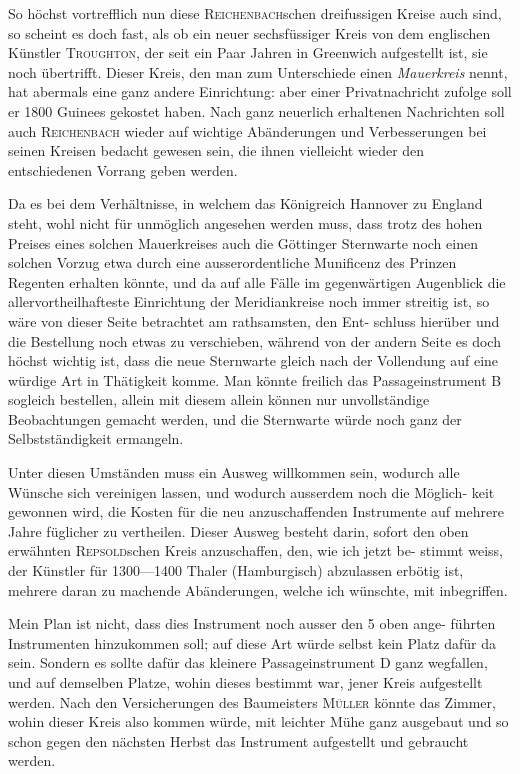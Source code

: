 \documentclass[12pt,a4paper]{article}
\theoremstyle{plain}
\theoremstyle{definition}
\theoremstyle{remark}
\begin{document}
So h\"{o}chst vortrefflich nun diese \textsc{Reichenbach}schen dreifussigen Kreise
auch sind, so scheint es doch fast, als ob ein neuer sechsf\"{u}ssiger Kreis von
dem englischen K\"{u}nstler \textsc{Troughton}, der seit ein Paar Jahren in Greenwich
aufgestellt ist, sie noch \"{u}bertrifft. Dieser Kreis, den man zum Unterschiede
einen \textit{Mauerkreis} nennt, hat abermals eine ganz andere Einrichtung: aber
einer Privatnachricht zufolge soll er 1800 Guinees gekostet haben. Nach ganz
neuerlich erhaltenen Nachrichten soll auch \textsc{Reichenbach} wieder auf wichtige
Ab\"{a}nderungen und Verbesserungen bei seinen Kreisen bedacht gewesen sein,
die ihnen vielleicht wieder den entschiedenen Vorrang geben werden.

Da es bei dem Verh\"{a}ltnisse, in welchem das K\"{o}nigreich Hannover zu
England steht, wohl nicht f\"{u}r unm\"{o}glich angesehen werden muss, dass trotz
des hohen Preises eines solchen Mauerkreises auch die G\"{o}ttinger Sternwarte
noch einen solchen Vorzug etwa durch eine ausserordentliche Munificenz des
Prinzen Regenten erhalten k\"{o}nnte, und da auf alle F\"{a}lle im gegenw\"{a}rtigen
Augenblick die allervortheilhafteste Einrichtung der Meridiankreise noch immer
streitig ist, so w\"{a}re von dieser Seite betrachtet am rathsamsten, den Ent-
schluss hier\"{u}ber und die Bestellung noch etwas zu verschieben, w\"{a}hrend von
der andern Seite es doch h\"{o}chst wichtig ist, dass die neue Sternwarte gleich
nach der Vollendung auf eine w\"{u}rdige Art in Th\"{a}tigkeit komme. Man k\"{o}nnte
freilich das Passageinstrument B sogleich bestellen, allein mit diesem allein
k\"{o}nnen nur unvollst\"{a}ndige Beobachtungen gemacht werden, und die Sternwarte
w\"{u}rde noch ganz der Selbstst\"{a}ndigkeit ermangeln.

Unter diesen Umst\"{a}nden muss ein Ausweg willkommen sein, wodurch
alle W\"{u}nsche sich vereinigen lassen, und wodurch ausserdem noch die M\"{o}glich-
keit gewonnen wird, die Kosten f\"{u}r die neu anzuschaffenden Instrumente auf
mehrere Jahre f\"{u}glicher zu vertheilen. Dieser Ausweg besteht darin, sofort
den oben erw\"{a}hnten \textsc{Repsold}schen Kreis anzuschaffen, den, wie ich jetzt be-
stimmt weiss, der K\"{u}nstler f\"{u}r 1300---1400 Thaler (Hamburgisch) abzulassen
erb\"{o}tig ist, mehrere daran zu machende Ab\"{a}nderungen, welche ich w\"{u}nschte,
mit inbegriffen.

Mein Plan ist nicht, dass dies Instrument noch ausser den 5 oben ange-
f\"{u}hrten Instrumenten hinzukommen soll; auf diese Art w\"{u}rde selbst kein
Platz daf\"{u}r da sein. Sondern es sollte daf\"{u}r das kleinere Passageinstrument
D ganz wegfallen, und auf demselben Platze, wohin dieses bestimmt war, jener
Kreis aufgestellt werden. Nach den Versicherungen des Baumeisters \textsc{M\"{u}ller}
k\"{o}nnte das Zimmer, wohin dieser Kreis also kommen w\"{u}rde, mit leichter
M\"{u}he ganz ausgebaut und so schon gegen den n\"{a}chsten Herbst das Instrument
aufgestellt und gebraucht werden.
\end{document}
